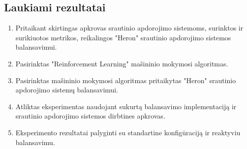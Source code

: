 \documentclass{VUMIFPSbakalaurinis}
\begin{document}
\subsection{Laukiami rezultatai}
\begin{enumerate}
    \item Pritaikant skirtingas apkrovas srautinio apdorojimo sistemoms, surinktos ir surikiuotos metrikos, reikalingos "Heron" srautinio apdorojimo sistemos balansavimui. 
    \item Pasirinktas "Reinforcement Learning" mašininio mokymosi algoritmas.
    \item Pasirinktas mašininio mokymosi algoritmas pritaikytas "Heron" srautinio apdorojimo sistemų balansavimui.  
    \item Atliktas eksperimentas naudojant sukurtą balansavimo implementaciją ir srautinio apdorojimo sistemos dirbtines apkrovas.
    \item Eksperimento rezultatai palyginti su standartine konfigūraciją ir reaktyviu balansavimu.
\end{enumerate}
 
\printbibliography[heading=bibintoc] 
\end{document}
